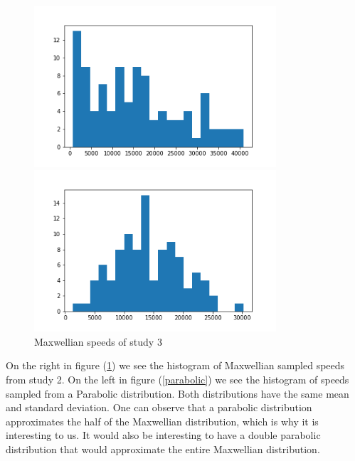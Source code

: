 \documentclass[12pt]{article}
\begin{document}
	\begin{figure}[H]
		\begin{multicols}{2}
			\includegraphics[width=\linewidth, height=6cm]{parabolic speed sampling.png} \caption{Parabolic speeds of study 2} \label{parabolic} \par
			\includegraphics[width=\linewidth, height=6cm]{maxwellian speed sampling.png} \caption{Maxwellian speeds of study 3} \label{maxwellian} \par
		\end{multicols}
	\end{figure}
	\noindent On the right in figure (\ref{maxwellian}) we see the histogram of Maxwellian sampled speeds from study 2. On the left in figure (\ref{parabolic}) we see the histogram of speeds sampled from a Parabolic distribution. Both distributions have the same mean and standard deviation. One can observe that a parabolic distribution approximates the half of the Maxwellian distribution, which is why it is interesting to us. It would also be interesting to have a double parabolic distribution that would approximate the entire Maxwellian distribution.  
\end{document}
